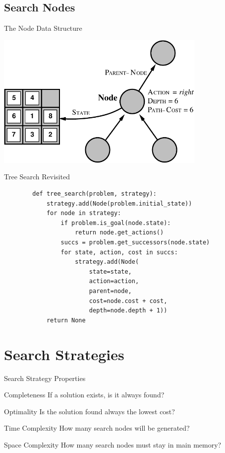 \documentclass[14pt]{beamer}
\begin{document}
\subsection{Search Nodes}

\begin{frame}{The Node Data Structure}
	\begin{center}
		\includegraphics[width=4in]{state-vs-node.pdf}
	\end{center}
\end{frame}

\begin{frame}[fragile]{Tree Search Revisited}
	\footnotesize
	\begin{lstlisting}
		def tree_search(problem, strategy):
		    strategy.add(Node(problem.initial_state))
		    for node in strategy:
		        if problem.is_goal(node.state):
		            return node.get_actions()
		        succs = problem.get_successors(node.state)
		        for state, action, cost in succs:
		            strategy.add(Node(
		                state=state,
		                action=action,
		                parent=node,
		                cost=node.cost + cost,
		                depth=node.depth + 1))
		    return None
	\end{lstlisting}
\end{frame}

\section{Search Strategies}
\begin{frame}[<+->]{Search Strategy Properties}
	\begin{block}{Completeness}
		If a solution exists, is it always found?
	\end{block}
	\begin{block}{Optimality}
		Is the solution found always the lowest cost?
	\end{block}
	\begin{block}{Time Complexity}
		How many search nodes will be generated?
	\end{block}
	\begin{block}{Space Complexity}
		How many search nodes must stay in main memory?
	\end{block}
\end{frame}
\end{document}
